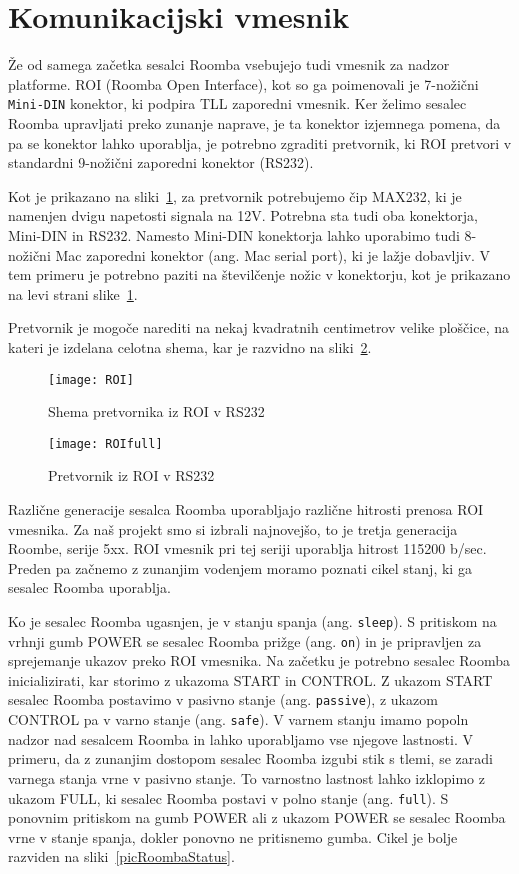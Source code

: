 \documentclass[a4paper, 12pt]{book}
\begin{document}
\section{Komunikacijski vmesnik}
Že od samega začetka sesalci Roomba vsebujejo tudi vmesnik za nadzor platforme. ROI (Roomba Open Interface), kot so ga poimenovali je 7-nožični {\tt Mini-DIN} konektor, ki podpira TLL zaporedni vmesnik. Ker želimo sesalec Roomba upravljati preko zunanje naprave, je ta konektor izjemnega pomena, da pa se konektor lahko uporablja, je potrebno zgraditi pretvornik, ki ROI pretvori v standardni 9-nožični zaporedni konektor (RS232).

Kot je prikazano na sliki~\ref{picROIshema}, za pretvornik potrebujemo čip MAX232, ki je namenjen dvigu napetosti signala na 12V. Potrebna sta tudi oba konektorja, Mini-DIN in RS232. Namesto Mini-DIN konektorja lahko uporabimo tudi 8-nožični Mac zaporedni konektor (ang. Mac serial port), ki je lažje dobavljiv. V tem primeru je potrebno paziti na številčenje nožic v konektorju, kot je prikazano na levi strani slike~\ref{picROIshema}. 

Pretvornik je mogoče narediti na nekaj kvadratnih centimetrov velike ploščice, na kateri je izdelana celotna shema, kar je razvidno na sliki~\ref{picROI}.

\begin{figure}[h]
	\centering
	\texttt{[image: ROI]}
	\caption{Shema pretvornika iz ROI v RS232~\cite{bibRoombaROI}}
	\label{picROIshema}
\end{figure}

\begin{figure}[h]
	\centering
	\texttt{[image: ROIfull]}
	\caption{Pretvornik iz ROI v RS232~\cite{bibRoombaROI}}
	\label{picROI}
\end{figure}

Različne generacije sesalca Roomba uporabljajo različne hitrosti prenosa ROI vmesnika. Za naš projekt smo si izbrali najnovejšo, to je tretja generacija Roombe, serije 5xx. ROI vmesnik pri tej seriji uporablja hitrost 115200 b/sec. Preden pa začnemo z zunanjim vodenjem moramo poznati cikel stanj, ki ga sesalec Roomba uporablja. 

Ko je sesalec Roomba ugasnjen, je v stanju spanja (ang. {\tt sleep}). S pritiskom na vrhnji gumb POWER se sesalec Roomba prižge (ang. {\tt on}) in je pripravljen za sprejemanje ukazov preko ROI vmesnika. Na začetku je potrebno sesalec Roomba inicializirati, kar storimo z ukazoma START in CONTROL. Z ukazom START sesalec Roomba postavimo v pasivno stanje (ang. {\tt passive}), z ukazom CONTROL pa v varno stanje (ang. {\tt safe}). V varnem stanju imamo popoln nadzor nad sesalcem Roomba in lahko uporabljamo vse njegove lastnosti. V primeru, da z zunanjim dostopom sesalec Roomba izgubi stik s tlemi, se zaradi varnega stanja vrne v pasivno stanje. To varnostno lastnost lahko izklopimo z ukazom FULL, ki sesalec Roomba postavi v polno stanje (ang. {\tt full}). S ponovnim pritiskom na gumb POWER ali z ukazom POWER se sesalec Roomba vrne v stanje spanja, dokler ponovno ne pritisnemo gumba. Cikel je bolje razviden na sliki~\ref{picRoombaStatus}. 
\end{document}
